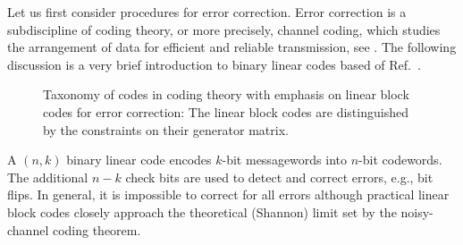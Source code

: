 Let us first consider procedures for error correction.
Error correction is a subdiscipline of coding theory, or more precisely, channel coding, which studies the arrangement of data for efficient and reliable transmission, see .
The following discussion is a very brief introduction to binary linear codes based of Ref.~\cite{MacKay2003,Mildenberger2013}.
\begin{figure}[htb]
	\centering
	
	\caption{Taxonomy of codes in coding theory with emphasis on linear block codes for error correction: The linear block codes are distinguished by the constraints on their generator matrix.}\label{fig:error_correction_codes}
\end{figure}
A $(n,k)$ binary linear code encodes $k$-bit messagewords into $n$-bit codewords.
The additional $n-k$ check bits are used to detect and correct errors, e.g., bit flips.
In general, it is impossible to correct for all errors although practical linear block codes closely approach the theoretical (Shannon) limit set by the noisy-channel coding theorem.

